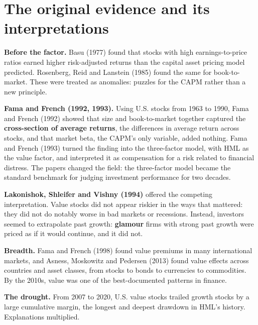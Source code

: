 \section{The original evidence and its interpretations}
\label{sec:08-evidence}

\textbf{Before the factor.} Basu (1977) found that stocks with high earnings-to-price ratios earned higher risk-adjusted returns than the capital asset pricing model predicted. Rosenberg, Reid and Lanstein (1985) found the same for book-to-market. These were treated as anomalies: puzzles for the CAPM rather than a new principle.

\textbf{Fama and French (1992, 1993).} Using U.S. stocks from 1963 to 1990, Fama and French (1992) showed that size and book-to-market together captured the \textbf{cross-section of average returns}, the differences in average return across stocks, and that market beta, the CAPM's only variable, added nothing. Fama and French (1993) turned the finding into the three-factor model, with HML as the value factor, and interpreted it as compensation for a risk related to financial distress. The papers changed the field: the three-factor model became the standard benchmark for judging investment performance for two decades.

\textbf{Lakonishok, Shleifer and Vishny (1994)} offered the competing interpretation. Value stocks did not appear riskier in the ways that mattered: they did not do notably worse in bad markets or recessions. Instead, investors seemed to extrapolate past growth: \textbf{glamour} firms with strong past growth were priced as if it would continue, and it did not.

\textbf{Breadth.} Fama and French (1998) found value premiums in many international markets, and Asness, Moskowitz and Pedersen (2013) found value effects across countries and asset classes, from stocks to bonds to currencies to commodities. By the 2010s, value was one of the best-documented patterns in finance.

\textbf{The drought.} From 2007 to 2020, U.S. value stocks trailed growth stocks by a large cumulative margin, the longest and deepest drawdown in HML's history. Explanations multiplied.

